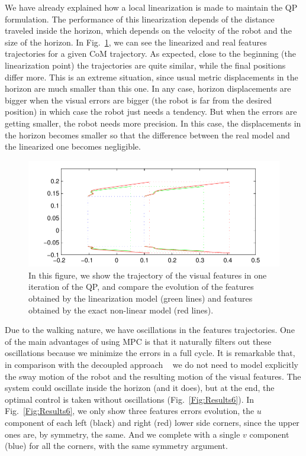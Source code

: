 We have already explained how a local linearization is made to maintain the QP formulation. The performance of this linearization depends of the distance traveled inside the horizon, which depends on the velocity of the robot and the size of the horizon. In Fig.~\ref{Fig:Results5}, we can see the linearized and real features trajectories for a given CoM trajectory. As expected, close to the beginning (the linearization point) the trajectories are quite similar, while the final positions differ more. This is an extreme situation, since usual metric displacements in the horizon are much smaller than this one. In any case, horizon displacements are bigger when the visual errors are bigger (the robot is far from the desired position) in which case the robot just needs a tendency. But when the errors are getting smaller, the robot needs more precision. In this case, the displacements in the horizon becomes smaller so that the difference between the real model and the linearized one becomes negligible.

\begin{figure}[h]
 \centering
 \includegraphics[scale=.8]{Chap4-Visual-Servoing/comparison_linearization}
 \caption{\label{Fig:Results5}\small{In this figure, we show the trajectory of the visual features in one iteration of the QP, and compare the evolution of the features obtained by the linearization model (green lines) and features obtained by the exact non-linear model (red lines).}}
 \end{figure}

Due to the walking nature, we have oscillations in the features trajectories. One of the main advantages of using MPC is that it naturally filters out these oscillations because we minimize the errors in a full cycle. It is remarkable that, in comparison with the decoupled approach ~\citep{DuneIROS2010} we do not need to model explicitly the sway motion of the robot and the resulting motion of the visual features. The system could oscillate inside the horizon (and it does), but at the end, the optimal control is taken without oscillations (Fig.~\ref{Fig:Results6}). In Fig.~\ref{Fig:Results6}, we only show three features errors evolution, the $u$ component of each left (black) and right (red) lower side corners, since the upper ones are, by symmetry, the same. And we complete with a single $v$ component (blue) for all the corners, with the same symmetry argument. 

